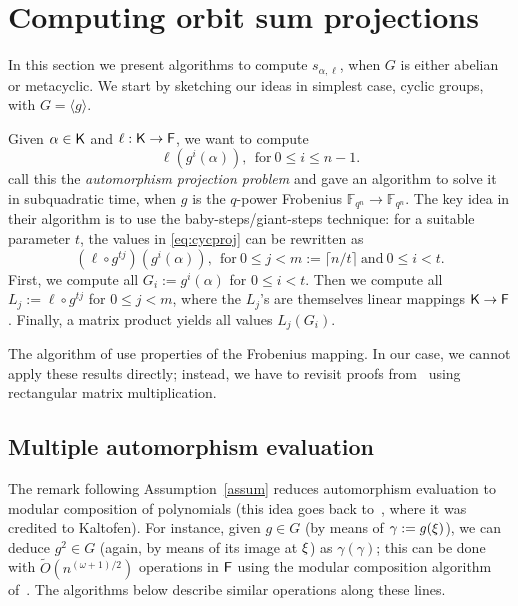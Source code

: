 \section{Computing orbit sum projections}
\label{sec:osum}

In this section we present algorithms to compute $s_{\alpha,\ell}$,
when $G$ is either abelian or metacyclic. We start by sketching our
ideas in simplest case, cyclic groups, with $G = \langle g \rangle$. 

Given $\alpha\in{\mathsf{K}}$ and
$\ell:{\mathsf{K}} \to {\mathsf{F}}$, we want to compute
\begin{equation}
  \label{eq:cycproj}
  \ell(g^i(\alpha)), ~~\mbox{for}~ 0\leq i\leq n-1.
\end{equation}
 call this the \emph{automorphism projection problem} and
gave an algorithm to solve it in subquadratic time, when $g$ is the
$q$-power Frobenius $\mathbb{F}_{q^n} \to \mathbb{F}_{q^n}$.  The key idea in their
algorithm is to use the baby-steps/giant-steps technique: for a suitable
parameter $t$, the values in \eqref{eq:cycproj} can be rewritten as
\[
  (\ell \circ g^{tj})(g^i(\alpha)), ~~\mbox{for}~ 0 \leq j < m:=\lceil n/t
  \rceil ~\mbox{and}~ 0 \leq i <t.
\]
First, we compute all $G_i:=g^i(\alpha)$ for $0 \leq i <t$.  Then we compute
all $L_j:=\ell \circ g^{tj}$ for $0 \leq j <m$, where the $L_j$'s are
themselves linear mappings ${\mathsf{K}} \to {\mathsf{F}}$.  Finally, a matrix product yields
all values $L_j(G_i)$.

The algorithm of  use properties of the Frobenius
mapping. In our case, we cannot apply
these results directly; instead, we have to revisit proofs
from~ using rectangular matrix multiplication.



\subsection{Multiple automorphism evaluation}

The remark following Assumption~\ref{assum} reduces automorphism
evaluation to modular composition of polynomials (this idea goes back to~, where it was credited to
Kaltofen).
For instance, given $g \in G$ (by means of $\gamma:=g(\xi)$), we can
deduce $g^2 \in G$ (again, by means of its image at $\xi$) as
$\gamma(\gamma)$; this can be done with $\tilde{O}(n^{(\omega+1)/2})$
operations in ${\mathsf{F}}$ using the modular composition
algorithm of~\cite{BrKu78}. The algorithms below describe similar operations
along these lines.

